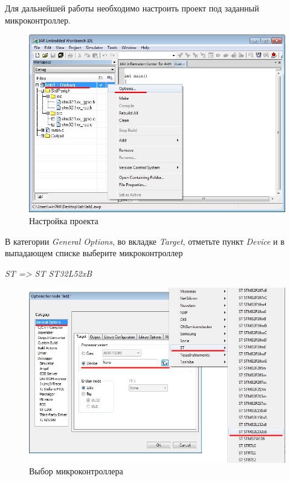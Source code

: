 Для дальнейшей работы необходимо настроить проект под заданный микроконтроллер.

\begin{figure}[h!]
\begin{center}
\includegraphics[scale=0.5]{Image/8.jpg}
\end{center}
\caption{Настройка проекта}
\end{figure}

В категории  \textit{ General Options}, во вкладке \textit{Target}, отметьте пункт \textit{Device} и в выпадающем списке выберите микроконтроллер 
\begin{center}
\textit{ST => ST ST32L52xB}
\end{center}

\begin{figure}[H]
\begin{center}
\includegraphics[scale=0.5]{Image/9.jpg}
\end{center}
\caption{Выбор микроконтроллера}
\end{figure}

